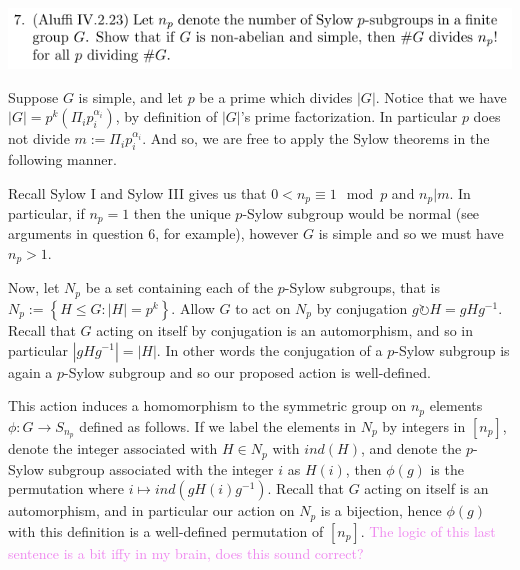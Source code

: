 \documentclass[12pt,letterpaper,boxed]{hmcpset}
\newcommand{\wg}[1]{\textcolor{violet}{#1}}
\newcommand{\abs}[1]{\left|#1\right|}
\newcommand{\inv}{^{-1}}
\begin{document}
\newpage


\begin{problem}
	\includegraphics[scale=0.8]{7.png}
	\hfill
\end{problem}

\begin{solution}
Suppose $G$ is simple, and let $p$ be a prime which divides $\abs G$. 
Notice that we have $\abs G = p^k \left( \Pi_i p_i^{\alpha_i}
\right)$, by definition of $\abs G$'s prime factorization. In
particular $p$ does not divide $m := \Pi_i p_i^{\alpha_i}$.
And so, we are free to apply the Sylow theorems in the following
manner.

Recall Sylow I and Sylow III gives us that $0 < n_p \equiv 1\mod p$
and $n_p \vert m$. In particular, if $n_p = 1$ then the unique
$p$-Sylow subgroup would be normal (see arguments in question $6$, for
example), however $G$ is simple and so we must have $n_p > 1$. 

Now, let $N_p$ be a set containing each of the $p$-Sylow subgroups,
that is \newline $N_p := \left\{ H \leq G : \abs{H} = p^k \right\}$. Allow $G$
to act on $N_p$ by conjugation $g \circlearrowright H = g H g\inv$. 
Recall that $G$ acting on itself by conjugation is an automorphism,
and so in particular $\abs{g H g\inv} = \abs{H}$. In other words the
conjugation of a $p$-Sylow subgroup is again a $p$-Sylow subgroup and
so our proposed action is well-defined.

This action induces a homomorphism to the symmetric group on $n_p$
elements $\phi: G \to S_{n_p}$ defined as follows.
If we label the elements in $N_p$ by
integers in $[n_p]$, denote the integer associated with $H \in N_p$
with $ind(H)$, and denote the $p$-Sylow subgroup associated with the
integer $i$ as $H(i)$,
then $\phi(g)$ is the permutation where $i \mapsto ind(g H(i) g\inv)$.
Recall that $G$ acting on itself is an automorphism, and in particular
our action on $N_p$ is a bijection, hence $\phi(g)$ with this
definition is a well-defined permutation of $[n_p]$. \wg{The logic of
this last sentence is a bit iffy in my brain, does this sound correct?}


\end{solution}
\end{document}
